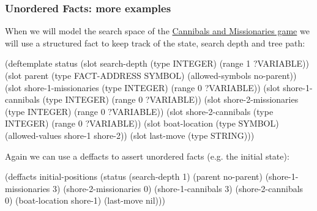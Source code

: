 \documentclass[xcolor={usenames,dvipsnames,svgnames}, compress]{beamer}
\begin{document}
\begin{frame}[fragile]
  \frametitle{Unordered Facts: more examples}
  When we will model the search space of the \href{http://en.wikipedia.org/wiki/Missionaries_and_cannibals_problem}{Cannibals and Missionaries game} we will use a structured
  fact to keep track of the state, search depth and tree path:
  \begin{clips-code}[numbers=none]
    (deftemplate status 
        (slot search-depth (type INTEGER) (range 1 ?VARIABLE))
        (slot parent (type FACT-ADDRESS SYMBOL) (allowed-symbols no-parent))
        (slot shore-1-missionaries (type INTEGER) (range 0 ?VARIABLE))
        (slot shore-1-cannibals (type INTEGER) (range 0 ?VARIABLE))
        (slot shore-2-missionaries (type INTEGER) (range 0 ?VARIABLE))
        (slot shore-2-cannibals (type INTEGER) (range 0 ?VARIABLE))
        (slot boat-location (type SYMBOL) (allowed-values shore-1 shore-2))
        (slot last-move (type STRING)))
  \end{clips-code}
  
  Again we can use a \textsf{deffacts} to assert unordered facts
  (e.g. the
  initial state):
  \begin{clips-code}[numbers=none]
    (deffacts initial-positions
        (status (search-depth 1) 
            (parent no-parent) (shore-1-missionaries 3)
            (shore-2-missionaries 0) (shore-1-cannibals 3)
            (shore-2-cannibals 0) (boat-location shore-1) (last-move
            nil)))
          \end{clips-code}
\end{frame}
\end{document}
